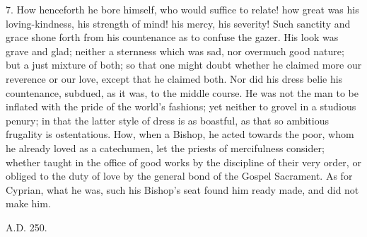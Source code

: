 7. How henceforth he bore
himself, who would suffice to relate! how great was his
loving-kindness, his strength of mind! his mercy, his severity! Such
sanctity and grace shone forth from his countenance as to confuse the
gazer. His look was grave and glad; neither a sternness which was sad,
nor overmuch good nature; but a just mixture of both; so that one
might doubt whether he claimed more our reverence or our love, except
that he claimed both. Nor did his dress belie his countenance,
subdued, as it was, to the middle course. He was not the man to be
inflated with the pride of the world's fashions; yet neither to grovel
in a studious penury; in that the latter style of dress is as
boastful, as that so ambitious frugality is ostentatious. How, when a
Bishop, he acted towards the poor, whom he already loved as a
catechumen, let the priests of mercifulness consider; whether taught
in the office of good works by the discipline of their very order, or
obliged to the duty of love by the general bond of the Gospel
Sacrament. As for Cyprian, what he was, such his Bishop's seat found
him ready made, and did not make him.

A.D. 250.

